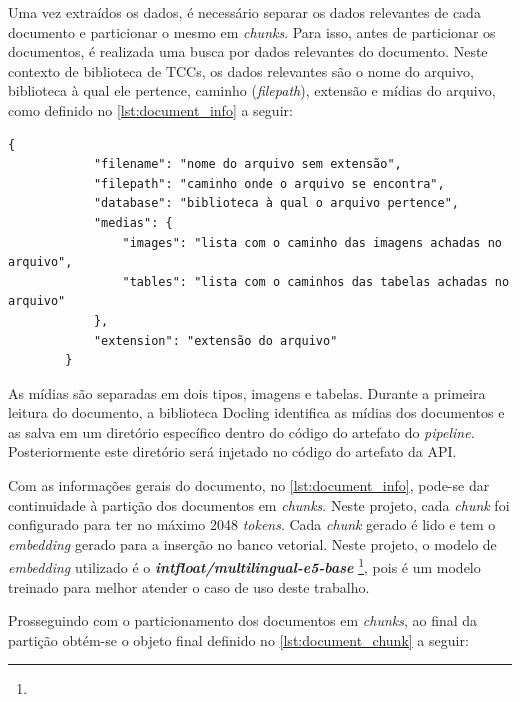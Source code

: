 \documentclass[a4paper, 12pt]{article}
\begin{document}
    Uma vez extraídos os dados, é necessário separar os dados relevantes de cada documento e particionar o mesmo em \textit{chunks}. Para isso, antes de particionar os documentos, é realizada uma busca por dados relevantes do documento. Neste contexto de biblioteca de TCCs, os dados relevantes são o nome do arquivo, biblioteca à qual ele pertence, caminho (\textit{filepath}), extensão e mídias do arquivo, como definido no \autoref{lst:document_info} a seguir:

    \clearpage
    
    \begin{lstlisting}[caption={Objeto com dados mais superficiais do documento.}, label={lst:document_info}]
        {
            "filename": "nome do arquivo sem extensão",
            "filepath": "caminho onde o arquivo se encontra",
            "database": "biblioteca à qual o arquivo pertence",
            "medias": {
                "images": "lista com o caminho das imagens achadas no arquivo",
                "tables": "lista com o caminhos das tabelas achadas no arquivo"
            },
            "extension": "extensão do arquivo"
        }
    \end{lstlisting}
    
    As mídias são separadas em dois tipos, imagens e tabelas. Durante a primeira leitura do documento, a biblioteca Docling identifica as mídias dos documentos e as salva em um diretório específico dentro do código do artefato do \textit{pipeline}. Posteriormente este diretório será injetado no código do artefato da API.

    Com as informações gerais do documento, no \autoref{lst:document_info}, pode-se dar continuidade à partição dos documentos em \textit{chunks}. Neste projeto, cada \textit{chunk} foi configurado para ter no máximo 2048 \textit{tokens}. Cada \textit{chunk} gerado é lido e tem o \textit{embedding} gerado para a inserção no banco vetorial. Neste projeto, o modelo de \textit{embedding} utilizado é o \textit{\textbf{intfloat/multilingual-e5-base}} \footnote{}, pois é um modelo treinado para melhor atender o caso de uso deste trabalho.
    
    Prosseguindo com o particionamento dos documentos em \textit{chunks}, ao final da partição obtém-se o objeto final definido no \autoref{lst:document_chunk} a seguir:

    \clearpage
\end{document}
